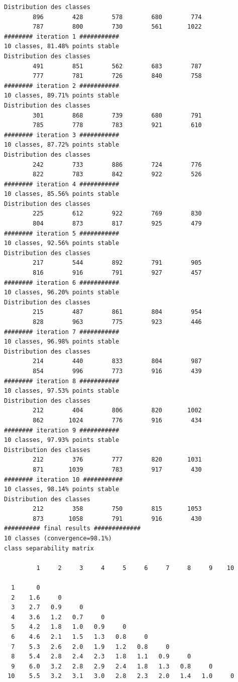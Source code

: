 \documentclass[environments,article,submit,pdftex,moreauthors]{Definitions/mdpi}
\begin{document}
\begin{scriptsize}
\begin{verbatim}
Distribution des classes
        896        428        578        680        774
        787        800        730        561       1022
######## iteration 1 ###########
10 classes, 81.48% points stable
Distribution des classes
        491        851        562        683        787
        777        781        726        840        758
######## iteration 2 ###########
10 classes, 89.71% points stable
Distribution des classes
        301        868        739        680        791
        785        778        783        921        610
######## iteration 3 ###########
10 classes, 87.72% points stable
Distribution des classes
        242        733        886        724        776
        822        783        842        922        526
######## iteration 4 ###########
10 classes, 85.56% points stable
Distribution des classes
        225        612        922        769        830
        804        873        817        925        479
######## iteration 5 ###########
10 classes, 92.56% points stable
Distribution des classes
        217        544        892        791        905
        816        916        791        927        457
######## iteration 6 ###########
10 classes, 96.20% points stable
Distribution des classes
        215        487        861        804        954
        828        963        775        923        446
######## iteration 7 ###########
10 classes, 96.98% points stable
Distribution des classes
        214        440        833        804        987
        854        996        773        916        439
######## iteration 8 ###########
10 classes, 97.53% points stable
Distribution des classes
        212        404        806        820       1002
        862       1024        776        916        434
######## iteration 9 ###########
10 classes, 97.93% points stable
Distribution des classes
        212        376        777        820       1031
        871       1039        783        917        430
######## iteration 10 ###########
10 classes, 98.14% points stable
Distribution des classes
        212        358        750        815       1053
        873       1058        791        916        430
########## final results #############
10 classes (convergence=98.1%)
class separability matrix

         1     2     3     4     5     6     7     8     9    10

  1      0
  2    1.6     0
  3    2.7   0.9     0
  4    3.6   1.2   0.7     0
  5    4.2   1.8   1.0   0.9     0
  6    4.6   2.1   1.5   1.3   0.8     0
  7    5.3   2.6   2.0   1.9   1.2   0.8     0
  8    5.4   2.8   2.4   2.3   1.8   1.1   0.9     0
  9    6.0   3.2   2.8   2.9   2.4   1.8   1.3   0.8     0
 10    5.5   3.2   3.1   3.0   2.8   2.3   2.0   1.4   1.0     0


\end{verbatim}
\end{scriptsize}
\end{document}
